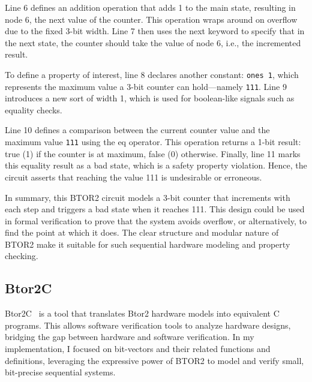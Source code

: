 Line 6 defines an addition operation that adds 1 to the main state, resulting in node 6, the next value of the counter. This operation wraps around on overflow due to the fixed 3-bit width. Line 7 then uses the next keyword to specify that in the next state, the counter should take the value of node 6, i.e., the incremented result.

To define a property of interest, line 8 declares another constant: \verb|ones 1|, which represents the maximum value a 3-bit counter can hold—namely \verb|111|. Line 9 introduces a new sort of width 1, which is used for boolean-like signals such as equality checks.

Line 10 defines a comparison between the current counter value and the maximum value \verb|111| using the eq operator. This operation returns a 1-bit result: true (1) if the counter is at maximum, false (0) otherwise. Finally, line 11 marks this equality result as a bad state, which is a safety property violation. Hence, the circuit asserts that reaching the value 111 is undesirable or erroneous.


In summary, this BTOR2 circuit models a 3-bit counter that increments with each step and triggers a bad state when it reaches 111. This design could be used in formal verification to prove that the system avoids overflow, or alternatively, to find the point at which it does. The clear structure and modular nature of BTOR2 make it suitable for such sequential hardware modeling and property checking.

\subsection{Btor2C}


Btor2C~\cite{btor2c} is a tool that translates Btor2 hardware models into equivalent C programs. This allows software verification tools to analyze hardware designs, bridging the gap between hardware and software verification.
 In my implementation, I focused on bit-vectors and their related functions and definitions, leveraging the expressive power of BTOR2 to model and verify small, bit-precise sequential systems.

